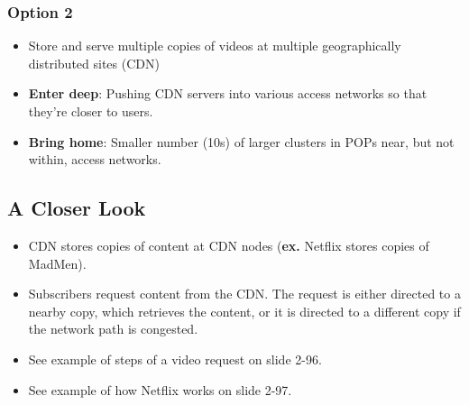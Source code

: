 \documentclass{article}
\begin{document}
\subsubsection{Option 2}
\begin{itemize}
\item Store and serve multiple copies of videos at multiple geographically distributed sites (CDN)
\item {\bf Enter deep}: Pushing CDN servers into various access networks so that they're closer to users.
\item {\bf Bring home}: Smaller number (10s) of larger clusters in POPs near, but not within, access networks.
\end{itemize}

\subsection{A Closer Look}

\begin{itemize}
\item CDN stores copies of content at CDN nodes ({\bf ex.} Netflix stores copies of MadMen).
\item Subscribers request content from the CDN. The request is either directed to a nearby copy, which retrieves the content, or it is directed to a different copy if the network path is congested.
\item See example of steps of a video request on slide 2-96.
\item See example of how Netflix works on slide 2-97.
\end{itemize}
\end{document}
